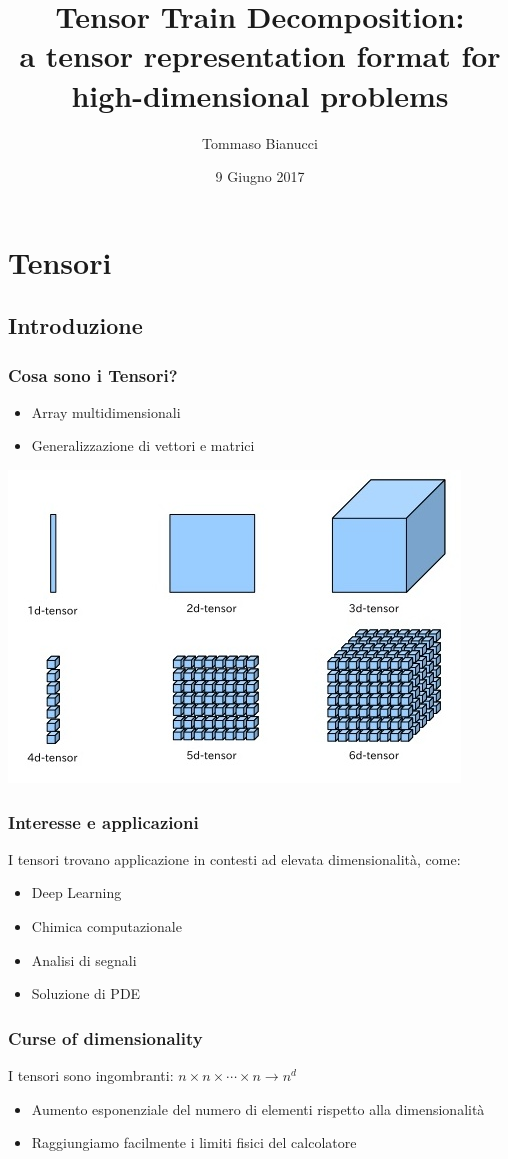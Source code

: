 \documentclass[compress]{beamer}
\title[]{Tensor Train Decomposition:\\ a tensor representation format for high-dimensional problems}
\author{Tommaso Bianucci}
\date{9 Giugno 2017}
\institute{Università di Pisa}
\theoremstyle{definition}
\theoremstyle{plain}
\begin{document}
\begin{frame}
\maketitle
\end{frame}

\section{Tensori}
\subsection{Introduzione}
\begin{frame}
\frametitle{Cosa sono i Tensori?}
\begin{itemize}
\item Array multidimensionali
\item Generalizzazione di vettori e matrici
\end{itemize}
\vspace{3mm}
\begin{center}
	\includegraphics[width=.5\textwidth]{Img/tensors.jpg}
\end{center}
\end{frame}

\begin{frame}
\frametitle{Interesse e applicazioni}
I tensori trovano applicazione in contesti ad elevata dimensionalità, come:
\begin{itemize}
\item Deep Learning
\item Chimica computazionale
\item Analisi di segnali
\item Soluzione di PDE
\end{itemize}
\end{frame}

\begin{frame}
\frametitle{Curse of dimensionality}
I tensori sono ingombranti: \alert{$n \times n \times \cdots \times n \rightarrow n^d$}
\begin{itemize}
\item Aumento esponenziale del numero di elementi rispetto alla dimensionalità
\item Raggiungiamo facilmente i limiti fisici del calcolatore
\end{itemize}

\end{frame}	
\end{document}
